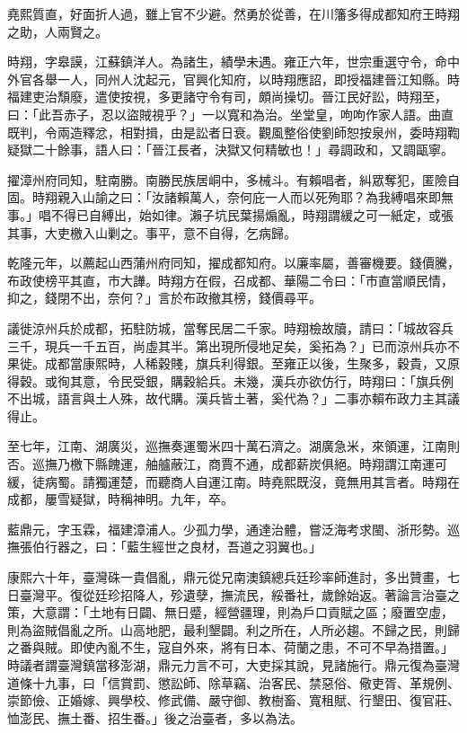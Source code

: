 \begin{pinyinscope}
堯熙質直，好面折人過，雖上官不少避。然勇於從善，在川籓多得成都知府王時翔之助，人兩賢之。

時翔，字皋謨，江蘇鎮洋人。為諸生，績學未遇。雍正六年，世宗重選守令，命中外官各舉一人，同州人沈起元，官興化知府，以時翔應詔，即授福建晉江知縣。時福建吏治頹廢，遣使按視，多更諸守令有司，頗尚操切。晉江民好訟，時翔至，曰：「此吾赤子，忍以盜賊視乎？」一以寬和為治。坐堂皇，呴呴作家人語。曲直既判，令兩造釋忿，相對揖，由是訟者日衰。觀風整俗使劉師恕按泉州，委時翔鞫疑獄二十餘事，語人曰：「晉江長者，決獄又何精敏也！」尋調政和，又調甌寧。

擢漳州府同知，駐南勝。南勝民族居峒中，多械斗。有賴唱者，糾眾奪犯，匿險自固。時翔親入山諭之曰：「汝諸賴萬人，奈何庇一人而以死殉耶？為我縛唱來即無事。」唱不得已自縛出，始如律。瀨子坑民葉揚煽亂，時翔謂緩之可一紙定，或張其事，大吏檄入山剿之。事平，意不自得，乞病歸。

乾隆元年，以薦起山西蒲州府同知，擢成都知府。以廉率屬，善審機要。錢價騰，布政使榜平其直，市大譁。時翔方在假，召成都、華陽二令曰：「市直當順民情，抑之，錢閉不出，奈何？」言於布政撤其榜，錢價尋平。

議徙涼州兵於成都，拓駐防城，當奪民居二千家。時翔檢故牘，請曰：「城故容兵三千，現兵一千五百，尚虛其半。第出現所侵地足矣，奚拓為？」已而涼州兵亦不果徙。成都當康熙時，人稀穀賤，旗兵利得銀。至雍正以後，生聚多，穀貴，又原得穀。或徇其意，令民受銀，購穀給兵。未幾，漢兵亦欲仿行，時翔曰：「旗兵例不出城，語言與土人殊，故代購。漢兵皆土著，奚代為？」二事亦賴布政力主其議得止。

至七年，江南、湖廣災，巡撫奏運蜀米四十萬石濟之。湖廣急米，來領運，江南則否。巡撫乃檄下縣餽運，舳艫蔽江，商賈不通，成都薪炭俱絕。時翔謂江南運可緩，徒病蜀。請獨運楚，而聽商人自運江南。時堯熙既沒，竟無用其言者。時翔在成都，屢雪疑獄，時稱神明。九年，卒。

藍鼎元，字玉霖，福建漳浦人。少孤力學，通達治體，嘗泛海考求閩、浙形勢。巡撫張伯行器之，曰：「藍生經世之良材，吾道之羽翼也。」

康熙六十年，臺灣硃一貴倡亂，鼎元從兄南澳鎮總兵廷珍率師進討，多出贊畫，七日臺灣平。復從廷珍招降人，殄遺孽，撫流民，綏番社，歲餘始返。著論言治臺之策，大意謂：「土地有日闢、無日蹙，經營疆理，則為戶口貢賦之區；廢置空虛，則為盜賊倡亂之所。山高地肥，最利墾闢。利之所在，人所必趨。不歸之民，則歸之番與賊。即使內亂不生，寇自外來，將有日本、荷蘭之患，不可不早為措置。」時議者謂臺灣鎮當移澎湖，鼎元力言不可，大吏採其說，見諸施行。鼎元復為臺灣道條十九事，曰「信賞罰、懲訟師、除草竊、治客民、禁惡俗、儆吏胥、革規例、崇節儉、正婚嫁、興學校、修武備、嚴守御、教樹畜、寬租賦、行墾田、復官莊、恤澎民、撫土番、招生番。」後之治臺者，多以為法。


\end{pinyinscope}
